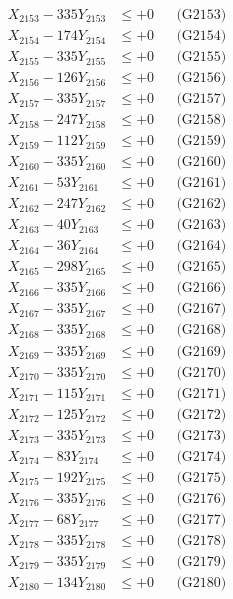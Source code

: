 \documentclass[a4paper,10pt]{article}
\begin{document}
{\begin{align}
X_{2153} - 335Y_{2153} &\leq +0 && \text{(G2153)} \\
X_{2154} - 174Y_{2154} &\leq +0 && \text{(G2154)} \\
X_{2155} - 335Y_{2155} &\leq +0 && \text{(G2155)} \\
X_{2156} - 126Y_{2156} &\leq +0 && \text{(G2156)} \\
X_{2157} - 335Y_{2157} &\leq +0 && \text{(G2157)} \\
X_{2158} - 247Y_{2158} &\leq +0 && \text{(G2158)} \\
X_{2159} - 112Y_{2159} &\leq +0 && \text{(G2159)} \\
X_{2160} - 335Y_{2160} &\leq +0 && \text{(G2160)} \\
\allowbreak
X_{2161} - 53Y_{2161} &\leq +0 && \text{(G2161)} \\
X_{2162} - 247Y_{2162} &\leq +0 && \text{(G2162)} \\
X_{2163} - 40Y_{2163} &\leq +0 && \text{(G2163)} \\
X_{2164} - 36Y_{2164} &\leq +0 && \text{(G2164)} \\
X_{2165} - 298Y_{2165} &\leq +0 && \text{(G2165)} \\
X_{2166} - 335Y_{2166} &\leq +0 && \text{(G2166)} \\
X_{2167} - 335Y_{2167} &\leq +0 && \text{(G2167)} \\
X_{2168} - 335Y_{2168} &\leq +0 && \text{(G2168)} \\
X_{2169} - 335Y_{2169} &\leq +0 && \text{(G2169)} \\
X_{2170} - 335Y_{2170} &\leq +0 && \text{(G2170)} \\
\allowbreak
X_{2171} - 115Y_{2171} &\leq +0 && \text{(G2171)} \\
X_{2172} - 125Y_{2172} &\leq +0 && \text{(G2172)} \\
X_{2173} - 335Y_{2173} &\leq +0 && \text{(G2173)} \\
X_{2174} - 83Y_{2174} &\leq +0 && \text{(G2174)} \\
X_{2175} - 192Y_{2175} &\leq +0 && \text{(G2175)} \\
X_{2176} - 335Y_{2176} &\leq +0 && \text{(G2176)} \\
X_{2177} - 68Y_{2177} &\leq +0 && \text{(G2177)} \\
X_{2178} - 335Y_{2178} &\leq +0 && \text{(G2178)} \\
X_{2179} - 335Y_{2179} &\leq +0 && \text{(G2179)} \\
X_{2180} - 134Y_{2180} &\leq +0 && \text{(G2180)} \\

\end{align}}
\end{document}
